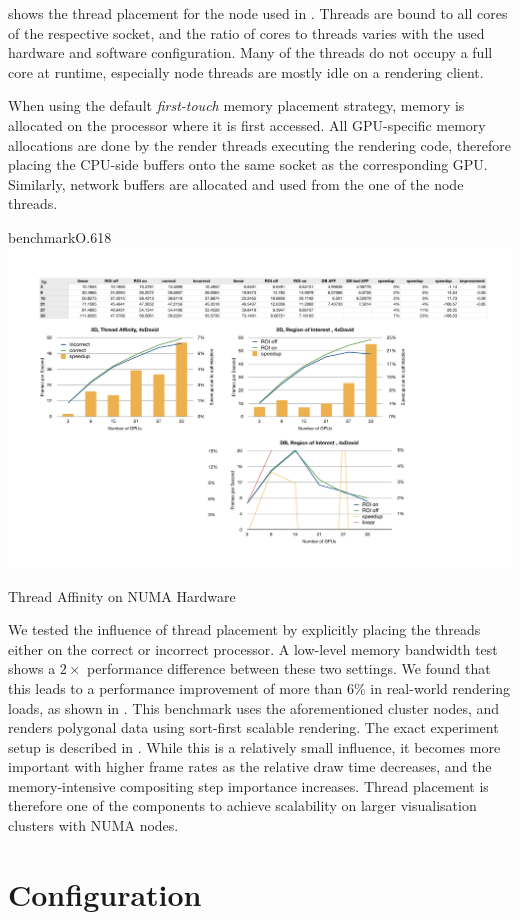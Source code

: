  shows the thread placement for the node used in
. Threads are bound to all cores of the respective socket, and
the ratio of cores to threads varies with the used hardware and software
configuration. Many of the threads do not occupy a full core at runtime,
especially node threads are mostly idle on a rendering client.

When using the default {\em first-touch} memory placement strategy, memory
is allocated on the processor where it is first accessed. All GPU-specific
memory allocations are done by the render threads executing the rendering code,
therefore placing the CPU-side buffers onto the same socket as the
corresponding GPU. Similarly, network buffers are allocated and used from the
one of the node threads.

\begin{wrapfloat}{benchmark}{O}{.618\textwidth}
 \includegraphics[width=.618\textwidth]{results/affinity.pdf}
 {\caption{\label{rNuma}Thread Affinity on NUMA Hardware}}
\end{wrapfloat}

We tested the influence of thread placement by explicitly placing the threads
either on the correct or incorrect processor. A low-level memory bandwidth test
shows a $2\times$ performance difference between these two settings. We found
that this leads to a performance improvement of more than 6\% in real-world
rendering loads, as shown in . This benchmark uses the
aforementioned cluster nodes, and renders polygonal data using sort-first
scalable rendering. The exact experiment setup is described in
\cite{EBAHMP:12}. While this is a relatively small influence, it becomes more
important with higher frame rates as the relative draw time decreases, and the
memory-intensive compositing step importance increases. Thread placement is therefore one
of the components to achieve scalability on larger visualisation clusters with
NUMA nodes.


\section{Configuration}

